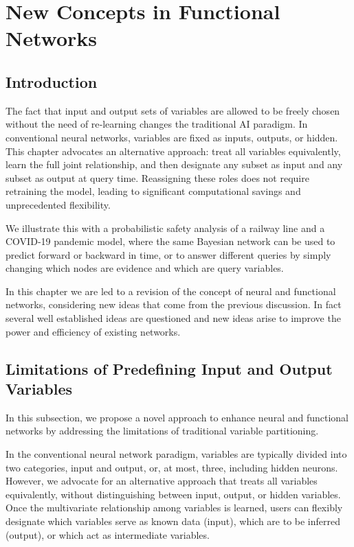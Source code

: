 \startcontents[chapter]
\chapter{New Concepts in Functional Networks}
\label{ch:newfunctionalnetworks}
\minitocboxed

\section*{Introduction}
The fact that input and output sets of variables are allowed to be freely chosen without the need of re‑learning changes the traditional AI paradigm. In conventional neural networks, variables are fixed as inputs, outputs, or hidden. This chapter advocates an alternative approach: treat all variables equivalently, learn the full joint relationship, and then designate any subset as input and any subset as output at query time. Reassigning these roles does not require retraining the model, leading to significant computational savings and unprecedented flexibility.

We illustrate this with a probabilistic safety analysis of a railway line and a COVID‑19 pandemic model, where the same Bayesian network can be used to predict forward or backward in time, or to answer different queries by simply changing which nodes are evidence and which are query variables.


In this chapter we are led to a revision of the concept of neural and functional networks, considering new ideas that come from the previous discussion. In fact several well established ideas are questioned and new ideas arise to improve the power and efficiency of existing networks.

\section{Limitations of Predefining Input and Output Variables}
In this subsection, we propose a novel approach to enhance neural and functional networks by addressing the limitations of traditional variable partitioning.

In the conventional neural network paradigm, variables are typically divided into two categories, input and output, or, at most, three, including hidden neurons. However, we advocate for an alternative approach that treats all variables equivalently, without distinguishing between input, output, or hidden variables. Once the multivariate relationship among variables is learned, users can flexibly designate which variables serve as known data (input), which are to be inferred (output), or which act as intermediate variables.

